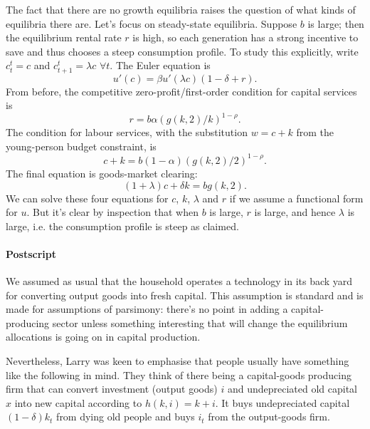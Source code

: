 \documentclass[11pt,letterpaper,reqno,oneside]{article}
\begin{document}
The fact that there are no growth equilibria raises the question of what kinds of equilibria there are. Let's focus on steady-state equilibria. Suppose $b$ is large; then the equilibrium rental rate $r$ is high, so each generation has a strong incentive to save and thus chooses a steep consumption profile. To study this explicitly, write $c^t_t = c$ and $c^t_{t+1} = \lambda c$ $\forall t$. The Euler equation is
%
\begin{equation*}
	u'(c) = \beta u'(\lambda c) ( 1 - \delta + r ) .
\end{equation*}
%
From before, the competitive zero-profit/first-order condition for capital services is
%
\begin{equation*}
	r = b \alpha (g(k,2)/k)^{1-\rho} .
\end{equation*}
%
The condition for labour services, with the substitution $w=c+k$ from the young-person budget constraint, is
%
\begin{equation*}
	c + k = b (1-\alpha) ( g(k,2)/2 )^{1-\rho} .
\end{equation*}
%
The final equation is goods-market clearing:
%
\begin{equation*}
	(1+\lambda)c + \delta k = b g(k,2) .
\end{equation*}
%
We can solve these four equations for $c$, $k$, $\lambda$ and $r$ if we assume a functional form for $u$. But it's clear by inspection that when $b$ is large, $r$ is large, and hence $\lambda$ is large, i.e. the consumption profile is steep as claimed.


\paragraph{Postscript}
We assumed as usual that the household operates a technology in its back yard for converting output goods into fresh capital. This assumption is standard and is made for assumptions of parsimony: there's no point in adding a capital-producing sector unless something interesting that will change the equilibrium allocations is going on in capital production.

Nevertheless, Larry was keen to emphasise that people usually have something like the following in mind. They think of there being a capital-goods producing firm that can convert investment (output goods) $i$ and undepreciated old capital $x$ into new capital according to $h(k,i) = k+i$. It buys undepreciated capital $(1-\delta)k_t$ from dying old people and buys $i_t$ from the output-goods firm.
\end{document}
